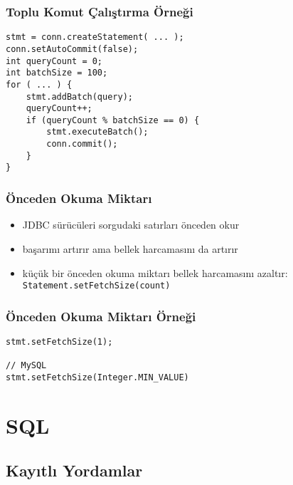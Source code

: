 \documentclass[dvipsnames]{beamer}
\theoremstyle{definition}
\theoremstyle{example}
\theoremstyle{plain}
\begin{document}
\begin{frame}[fragile]
  \frametitle{Toplu Komut Çalıştırma Örneği}

  \begin{block}{}
    \begin{lstlisting}
stmt = conn.createStatement( ... );
conn.setAutoCommit(false);
int queryCount = 0;
int batchSize = 100;
for ( ... ) {
    stmt.addBatch(query);
    queryCount++;
    if (queryCount % batchSize == 0) {
        stmt.executeBatch();
        conn.commit();
    }
}
    \end{lstlisting}
  \end{block}
\end{frame}

\begin{frame}
  \frametitle{Önceden Okuma Miktarı}

  \begin{itemize}
    \item JDBC sürücüleri sorgudaki satırları önceden okur
    \item başarımı artırır ama bellek harcamasını da artırır

    \pause
    \medskip
    \item küçük bir önceden okuma miktarı bellek harcamasını azaltır:\\
      \lstinline!Statement.setFetchSize(count)!
  \end{itemize}
\end{frame}

\begin{frame}[fragile]
  \frametitle{Önceden Okuma Miktarı Örneği}

  \begin{block}{}
    \begin{lstlisting}
stmt.setFetchSize(1);

// MySQL
stmt.setFetchSize(Integer.MIN_VALUE)
    \end{lstlisting}
  \end{block}
\end{frame}

\lstset{language=ExtendedSQL}

\section{SQL}

\subsection{Kayıtlı Yordamlar}
\end{document}
